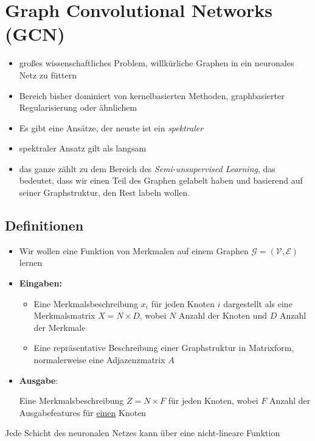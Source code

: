 \section{Graph Convolutional Networks (GCN)}

\begin{itemize}
  \item großes wissenschaftliches Problem, willkürliche Graphen in ein neuronales Netz zu füttern
  \item Bereich bisher dominiert von kernelbasierten Methoden, graphbasierter Regularisierung oder ähnlichem
  \item Es gibt eine Ansätze, der neuste ist ein \emph{spektraler}
  \item spektraler Ansatz gilt als langsam
  \item das ganze zählt zu dem Bereich des \emph{Semi-unsupervised Learning}, das bedeutet, dass wir einen Teil des Graphen gelabelt haben und basierend auf seiner Graphstruktur, den Rest labeln wollen.
\end{itemize}

\subsection{Definitionen}

\begin{itemize}
  \item Wir wollen eine Funktion von Merkmalen auf einem Graphen $\mathcal{G} = (\mathcal{V}, \mathcal{E})$ lernen
  \item \textbf{Eingaben:}
  \begin{itemize}
    \item Eine Merkmalsbeschreibung $x_i$ für jeden Knoten $i$ dargestellt als eine Merkmalsmatrix $X = N \times D$, wobei $N$ Anzahl der Knoten und $D$ Anzahl der Merkmale
    \item Eine repräsentative Beschreibung einer Graphstruktur in Matrixform, normalerweise eine Adjazenzmatrix $A$
  \end{itemize}
  \item \textbf{Ausgabe}:
  \begin{itemize}
      Eine Merkmalsbeschreibung $Z = N \times F$ für jeden Knoten, wobei $F$ Anzahl der Ausgabefeatures für \underline{einen} Knoten
  \end{itemize}
\end{itemize}

Jede Schicht des neuronalen Netzes kann über eine nicht-lineare Funktion


